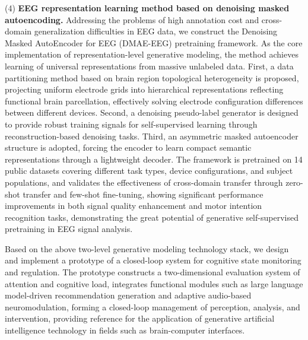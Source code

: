 \begin{eabstract}
(4) \textbf{EEG representation learning method based on denoising masked autoencoding.} Addressing the problems of high annotation cost and cross-domain generalization difficulties in EEG data, we construct the Denoising Masked AutoEncoder for EEG (DMAE-EEG) pretraining framework. As the core implementation of representation-level generative modeling, the method achieves learning of universal representations from massive unlabeled data. First, a data partitioning method based on brain region topological heterogeneity is proposed, projecting uniform electrode grids into hierarchical representations reflecting functional brain parcellation, effectively solving electrode configuration differences between different devices. Second, a denoising pseudo-label generator is designed to provide robust training signals for self-supervised learning through reconstruction-based denoising tasks. Third, an asymmetric masked autoencoder structure is adopted, forcing the encoder to learn compact semantic representations through a lightweight decoder. The framework is pretrained on 14 public datasets covering different task types, device configurations, and subject populations, and validates the effectiveness of cross-domain transfer through zero-shot transfer and few-shot fine-tuning, showing significant performance improvements in both signal quality enhancement and motor intention recognition tasks, demonstrating the great potential of generative self-supervised pretraining in EEG signal analysis.

Based on the above two-level generative modeling technology stack, we design and implement a prototype of a closed-loop system for cognitive state monitoring and regulation. The prototype constructs a two-dimensional evaluation system of attention and cognitive load, integrates functional modules such as large language model-driven recommendation generation and adaptive audio-based neuromodulation, forming a closed-loop management of perception, analysis, and intervention, providing reference for the application of generative artificial intelligence technology in fields such as brain-computer interfaces.
\end{eabstract}

